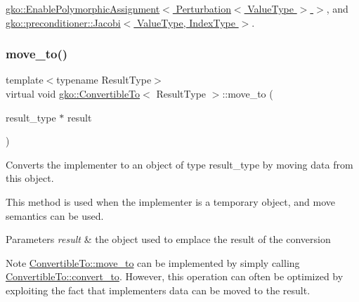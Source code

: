 \hyperlink{classgko_1_1EnablePolymorphicAssignment_a6b7e6872e96084636f8ab5091063ada8}{gko\+::\+Enable\+Polymorphic\+Assignment$<$ Perturbation$<$ Value\+Type $>$ $>$}, and \hyperlink{classgko_1_1preconditioner_1_1Jacobi_a54ce952ac4a12c3f4686442375cd4dc8}{gko\+::preconditioner\+::\+Jacobi$<$ Value\+Type, Index\+Type $>$}.

\mbox{\label{classgko_1_1ConvertibleTo_ab9047c7c49e0f83c79b54c0034d6197b}} 
\subsubsection{\texorpdfstring{move\+\_\+to()}{move\_to()}}
{\footnotesize\ttfamily template$<$typename Result\+Type$>$ \\
virtual void \hyperlink{classgko_1_1ConvertibleTo}{gko\+::\+Convertible\+To}$<$ Result\+Type $>$\+::move\+\_\+to (\begin{DoxyParamCaption}\item[{result\+\_\+type $\ast$}]{result }\end{DoxyParamCaption})\hspace{0.3cm}{\ttfamily [pure virtual]}}



Converts the implementer to an object of type result\+\_\+type by moving data from this object. 

This method is used when the implementer is a temporary object, and move semantics can be used.


\begin{DoxyParams}{Parameters}
{\em result} & the object used to emplace the result of the conversion\\
\hline
\end{DoxyParams}
\begin{DoxyNote}{Note}
\hyperlink{classgko_1_1ConvertibleTo_ab9047c7c49e0f83c79b54c0034d6197b}{Convertible\+To\+::move\+\_\+to} can be implemented by simply calling \hyperlink{classgko_1_1ConvertibleTo_aa7f3420babcbed39ee15bc020bed4f7e}{Convertible\+To\+::convert\+\_\+to}. However, this operation can often be optimized by exploiting the fact that implementer\textquotesingle{}s data can be moved to the result. 
\end{DoxyNote}


